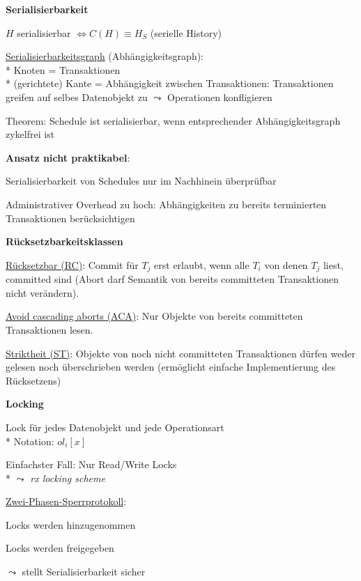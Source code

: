 \textbf{Serialisierbarkeit}
\begin{items}
	\item \( H \) serialisierbar \( \Leftrightarrow C(H) \equiv H_S \) (serielle History)
	\item \underline{Serialisierbarkeitsgraph} (Abhängigkeitsgraph):
		\\*
		Knoten = Transaktionen
		\\*
		(gerichtete) Kante = Abhängigkeit zwischen Transaktionen: Transaktionen greifen auf selbes Datenobjekt zu \( \leadsto \) Operationen konfligieren
	\item Theorem: Schedule ist serialisierbar, wenn entsprechender Abhängigkeitsgraph zykelfrei ist
	\item \textbf{Ansatz nicht praktikabel}:
	\begin{enumeration}
		\item Serialisierbarkeit von Schedules nur im Nachhinein überprüfbar
		\item Administrativer Overhead zu hoch: Abhängigkeiten zu bereits terminierten Transaktionen berücksichtigen
	\end{enumeration}
\end{items}

\textbf{Rücksetzbarkeitsklassen}
\begin{items}
	\item \underline{Rücksetzbar (RC)}: Commit für $T_j$ erst erlaubt, wenn alle $T_i$ von denen $T_j$ liest, committed sind (Abort darf Semantik von bereits committeten Transaktionen nicht verändern).
	\item \underline{Avoid cascading aborts (ACA)}: Nur Objekte von bereits committeten Transaktionen lesen.
	\item \underline{Striktheit (ST)}: Objekte von noch nicht committeten Transaktionen dürfen weder gelesen noch überschrieben werden (ermöglicht einfache Implementierung des Rücksetzens)
\end{items}

\textbf{Locking}
\begin{items}
	\item Lock für jedes Datenobjekt und jede Operationsart
		\\*
		Notation: \( ol_i[x] \)
	\item Einfachster Fall: Nur Read/Write Locks
		\\*
		\( \leadsto \) \emph{rx locking scheme}
	\item \underline{Zwei-Phasen-Sperrprotokoll}:
	\begin{enumeration}
		\item Locks werden hinzugenommen
		\item Locks werden freigegeben
	\end{enumeration}
	\( \leadsto \) stellt Serialisierbarkeit sicher
\end{items}

